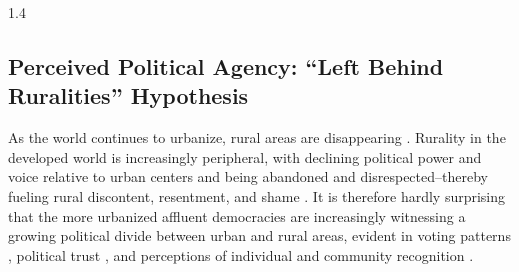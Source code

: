 \documentclass[10pt, letterpaper]{article}
\begin{document}
\begin{spacing}{1.4}
\subsection{Perceived Political Agency: ``Left Behind Ruralities'' Hypothesis}

 
As the world continues to urbanize, rural areas are disappearing 
 \citep{pospvech2024loss}. Rurality in the developed world is increasingly peripheral, with declining political power and voice relative to urban centers and being abandoned and disrespected--thereby fueling rural discontent, resentment, and shame \citep[see accounts in][]{hansonCityJournalautumn15,fullerNYT17monD}. %
  It is therefore hardly surprising that the more urbanized affluent democracies are increasingly witnessing a growing political divide between urban and rural areas, evident in voting patterns
  \citep{huijsmans2025great,mettler2022growing}, political trust \citep{mitsch2021faith}, and perceptions of individual and community recognition \citep{hyland2024feeling}. 


\end{spacing}
\end{document}
